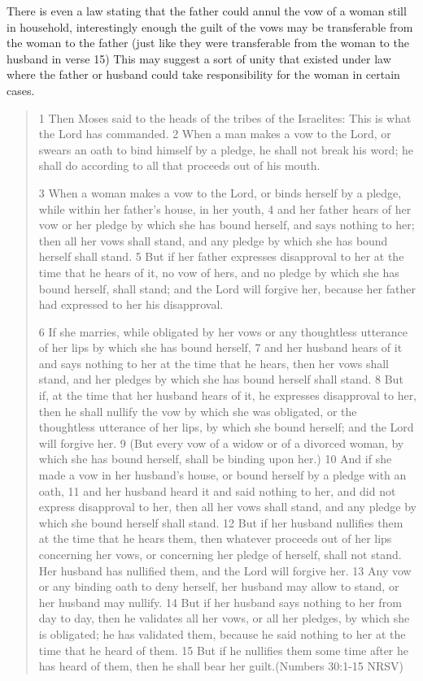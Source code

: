 \documentclass[11pt]{article}
\begin{document}
There is even a law stating that the father could annul the vow of a woman still in household, interestingly enough the guilt of the vows may be transferable from the woman to the father (just like they were transferable from the woman to the husband in verse 15) This may suggest a sort of unity that existed under law where the father or husband could take responsibility for the woman in certain cases. 
\begin{quote}
1 Then Moses said to the heads of the tribes of the Israelites: This is what the Lord has commanded. 2 When a man makes a vow to the Lord, or swears an oath to bind himself by a pledge, he shall not break his word; he shall do according to all that proceeds out of his mouth.

3 When a woman makes a vow to the Lord, or binds herself by a pledge, while within her father’s house, in her youth, 4 and her father hears of her vow or her pledge by which she has bound herself, and says nothing to her; then all her vows shall stand, and any pledge by which she has bound herself shall stand. 5 But if her father expresses disapproval to her at the time that he hears of it, no vow of hers, and no pledge by which she has bound herself, shall stand; and the Lord will forgive her, because her father had expressed to her his disapproval.

6 If she marries, while obligated by her vows or any thoughtless utterance of her lips by which she has bound herself, 7 and her husband hears of it and says nothing to her at the time that he hears, then her vows shall stand, and her pledges by which she has bound herself shall stand. 8 But if, at the time that her husband hears of it, he expresses disapproval to her, then he shall nullify the vow by which she was obligated, or the thoughtless utterance of her lips, by which she bound herself; and the Lord will forgive her. 9 (But every vow of a widow or of a divorced woman, by which she has bound herself, shall be binding upon her.) 10 And if she made a vow in her husband’s house, or bound herself by a pledge with an oath, 11 and her husband heard it and said nothing to her, and did not express disapproval to her, then all her vows shall stand, and any pledge by which she bound herself shall stand. 12 But if her husband nullifies them at the time that he hears them, then whatever proceeds out of her lips concerning her vows, or concerning her pledge of herself, shall not stand. Her husband has nullified them, and the Lord will forgive her. 13 Any vow or any binding oath to deny herself, her husband may allow to stand, or her husband may nullify. 14 But if her husband says nothing to her from day to day, then he validates all her vows, or all her pledges, by which she is obligated; he has validated them, because he said nothing to her at the time that he heard of them. 15 But if he nullifies them some time after he has heard of them, then he shall bear her guilt.(Numbers 30:1-15 NRSV)
\end{quote}
\end{document}
